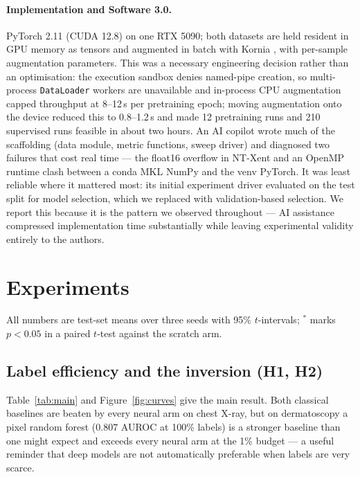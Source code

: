 \documentclass{article}
\begin{document}
\paragraph{Implementation and Software 3.0.} PyTorch 2.11 (CUDA 12.8) on one RTX 5090;
both datasets are held resident in GPU memory as tensors and augmented in batch with
Kornia \citep{riquelme2025kornia}, with per-sample augmentation parameters. This was a
necessary engineering decision rather than an optimisation: the execution sandbox denies
named-pipe creation, so multi-process \texttt{DataLoader} workers are unavailable and
in-process CPU augmentation capped throughput at 8--12\,s per pretraining epoch; moving
augmentation onto the device reduced this to 0.8--1.2\,s and made 12 pretraining runs and
210 supervised runs feasible in about two hours. An AI copilot wrote much of the
scaffolding (data module, metric functions, sweep driver) and diagnosed two failures that
cost real time --- the float16 overflow in NT-Xent and an OpenMP runtime clash between a
conda MKL NumPy and the venv PyTorch. It was least reliable where it mattered most: its
initial experiment driver evaluated on the test split for model selection, which we
replaced with validation-based selection. We report this because it is the pattern we
observed throughout --- AI assistance compressed implementation time substantially while
leaving experimental validity entirely to the authors.

\section{Experiments}

All numbers are test-set means over three seeds with 95\% $t$-intervals;
$^{*}$ marks $p<0.05$ in a paired $t$-test against the scratch arm.

\subsection{Label efficiency and the inversion (H1, H2)}

Table~\ref{tab:main} and Figure~\ref{fig:curves} give the main result. Both classical
baselines are beaten by every neural arm on chest X-ray, but on dermatoscopy a pixel
random forest ($0.807$ AUROC at 100\% labels) is a stronger baseline than one might
expect and exceeds every neural arm at the 1\% budget --- a useful reminder that deep
models are not automatically preferable when labels are very scarce.

\begin{table}[t]
\centering
\caption{Test AUROC by initialisation and label budget (mean $\pm$ 95\% CI over three
seeds). The pixel random forest is the non-neural reference.}
\label{tab:main}
\small

\end{table}
\end{document}
